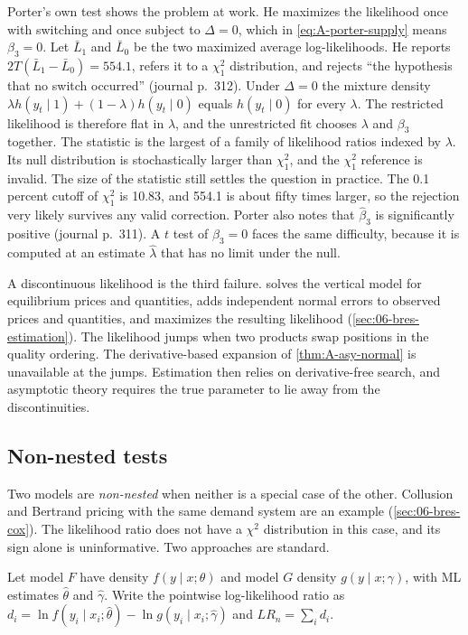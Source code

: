 Porter's own test shows the problem at work. He maximizes the likelihood once with switching and once subject to
$\Delta = 0$, which in \eqref{eq:A-porter-supply} means $\beta_3 = 0$. Let $\bar L_1$ and $\bar L_0$ be the two maximized
average log-likelihoods. He reports $2T(\bar L_1 - \bar L_0) = 554.1$, refers it to a $\chi^2_1$ distribution, and
rejects ``the hypothesis that no switch occurred'' (journal p.~312). Under $\Delta = 0$ the mixture density
$\lambda h(y_t \mid 1) + (1 - \lambda)h(y_t \mid 0)$ equals $h(y_t \mid 0)$ for every $\lambda$. The restricted
likelihood is therefore flat in $\lambda$, and the unrestricted fit chooses $\lambda$ and $\beta_3$ together. The
statistic is the largest of a family of likelihood ratios indexed by $\lambda$. Its null distribution is stochastically
larger than $\chi^2_1$, and the $\chi^2_1$ reference is invalid. The size of the statistic still settles the question in
practice. The 0.1 percent cutoff of $\chi^2_1$ is 10.83, and 554.1 is about fifty times larger, so the rejection very
likely survives any valid correction. Porter also notes that $\hat\beta_3$ is significantly positive (journal p.~311). A
$t$ test of $\beta_3 = 0$ faces the same difficulty, because it is computed at an estimate $\hat\lambda$ that has no
limit under the null.

A discontinuous likelihood is the third failure. \citet{Bresnahan1987} solves the vertical model for equilibrium prices
and quantities, adds independent normal errors to observed prices and quantities, and maximizes the resulting likelihood
(\cref{sec:06-bres-estimation}). The likelihood jumps when two products swap positions in the quality ordering. The derivative-based expansion of \cref{thm:A-asy-normal}
is unavailable at the jumps. Estimation then relies on derivative-free search, and asymptotic theory requires the true
parameter to lie away from the discontinuities.

\subsection{Non-nested tests}\label{sec:A-nonnested}

Two models are \emph{non-nested} when neither is a special case of the other. Collusion and Bertrand pricing with the same
demand system are an example (\cref{sec:06-bres-cox}). The likelihood ratio does not have a $\chi^2$ distribution in this
case, and its sign alone is uninformative. Two approaches are standard.

Let model $F$ have density $f(y \mid x;\theta)$ and model $G$ density $g(y \mid x;\gamma)$, with ML estimates $\hat\theta$ and
$\hat\gamma$. Write the pointwise log-likelihood ratio as $d_i = \ln f(y_i \mid x_i;\hat\theta) - \ln g(y_i \mid x_i;\hat\gamma)$
and $LR_n = \sum_id_i$.

